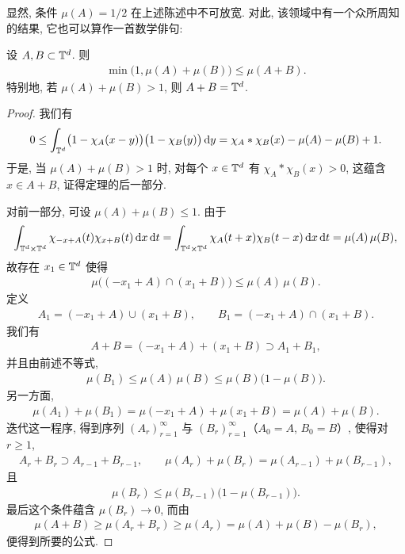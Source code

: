 显然, 条件 $\mu(A) = 1/2$ 在上述陈述中不可放宽. 对此, 该领域中有一个众所周知的结果, 它也可以算作一首数学俳句:

\begin{theorem}\label{thm:1.11}
设 $A, B \subset \mathbb{T}^d$. 则
\begin{align*}
  \min\bigl(1,\mu(A)+\mu(B)\bigr)\leq\mu(A+B).
\end{align*}
特别地, 若 $\mu(A) + \mu(B) > 1$, 则 $A + B = \mathbb{T}^d$.
\end{theorem}

\begin{proof}
我们有
\begin{align*}
  0\leq\int_{\mathbb{T}^{d}}\bigl(1-\chi_{A}(x-y)\bigr)\bigl(1-\chi_{B}(y)\bigr)\,\mathrm{d}y
  =\chi_{A}*\chi_{B}(x)-\mu(A)-\mu(B)+1.
\end{align*}
于是, 当 $\mu(A) + \mu(B) > 1$ 时, 对每个 $x \in \mathbb{T}^d$ 有 $\chi_A * \chi_B(x) > 0$, 这蕴含 $x \in A + B$, 证得定理的后一部分.

对前一部分, 可设 $\mu(A) + \mu(B) \leq 1$. 由于
\begin{align*}
  \int_{\mathbb{T}^{d}\times\mathbb{T}^{d}}\chi_{-x+A}(t)\chi_{x+B}(t)\,\mathrm{d}x\,\mathrm{d}t
  =\int_{\mathbb{T}^{d}\times\mathbb{T}^{d}}\chi_{A}(t+x)\chi_{B}(t-x)\,\mathrm{d}x\,\mathrm{d}t
  =\mu(A)\,\mu(B),
\end{align*}
故存在 $x_1 \in \mathbb{T}^d$ 使得
\begin{align*}
  \mu\bigl(\left(-x_{1}+A\right)\cap\left(x_{1}+B\right)\bigr)\leq\mu(A)\,\mu(B).
\end{align*}
定义
\begin{align*}
  A_{1}=\left(-x_{1}+A\right)\cup\left(x_{1}+B\right),\qquad
  B_{1}=\left(-x_{1}+A\right)\cap\left(x_{1}+B\right).
\end{align*}
我们有
\begin{align*}
  A+B=\left(-x_{1}+A\right)+\left(x_{1}+B\right)\supset A_{1}+B_{1},
\end{align*}
并且由前述不等式,
\begin{align*}
  \mu(B_{1})\leq\mu(A)\,\mu(B)\leq\mu(B)\bigl(1-\mu(B)\bigr).
\end{align*}
另一方面,
\begin{align*}
  \mu(A_{1})+\mu(B_{1})=\mu(-x_{1}+A)+\mu(x_{1}+B)=\mu(A)+\mu(B).
\end{align*}
迭代这一程序, 得到序列 $(A_r)_{r=1}^{\infty}$ 与 $(B_r)_{r=1}^{\infty}$（$A_0 = A$, $B_0 = B$）, 使得对 $r \geq 1$,
\begin{align*}
  A_{r}+B_{r}\supset A_{r-1}+B_{r-1},\qquad
  \mu(A_{r})+\mu(B_{r})=\mu(A_{r-1})+\mu(B_{r-1}),
\end{align*}
且
\begin{align*}
  \mu(B_{r})\leq\mu(B_{r-1})\bigl(1-\mu(B_{r-1})\bigr).
\end{align*}
最后这个条件蕴含 $\mu(B_r) \to 0$, 而由
\begin{align*}
  \mu(A+B)\geq\mu(A_{r}+B_{r})\geq\mu(A_{r})=\mu(A)+\mu(B)-\mu(B_{r}),
\end{align*}
便得到所要的公式.
\end{proof}

